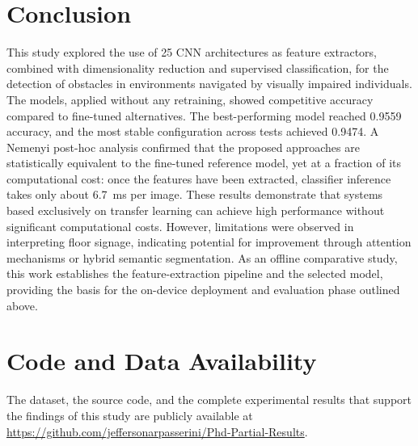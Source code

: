 \documentclass[preprint,12pt]{elsarticle}
\begin{document}
\section{Conclusion}
This study explored the use of 25 CNN architectures as feature extractors, combined with dimensionality reduction and supervised classification, for the detection of obstacles in environments navigated by visually impaired individuals. The models, applied without any retraining, showed competitive accuracy compared to fine-tuned alternatives. The best-performing model reached 0.9559 accuracy, and the most stable configuration across tests achieved 0.9474. A Nemenyi post-hoc analysis confirmed that the proposed approaches are statistically equivalent to the fine-tuned reference model, yet at a fraction of its computational cost: once the features have been extracted, classifier inference takes only about 6.7~ms per image. These results demonstrate that systems based exclusively on transfer learning can achieve high performance without significant computational costs. However, limitations were observed in interpreting floor signage, indicating potential for improvement through attention mechanisms or hybrid semantic segmentation. As an offline comparative study, this work establishes the feature-extraction pipeline and the selected model, providing the basis for the on-device deployment and evaluation phase outlined above.

\section*{Code and Data Availability}
The dataset, the source code, and the complete experimental results that support the findings of this study are publicly available at \url{https://github.com/jeffersonarpasserini/Phd-Partial-Results}.




\end{document}
